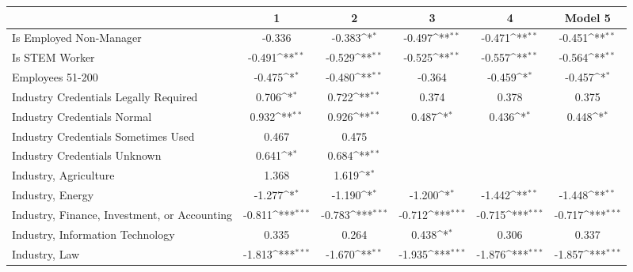 {
\def\sym#1{\ifmmode^{#1}\else\(^{#1}\)\fi}
\begin{tabular}{l*{5}{c}}
\toprule
                         &\multicolumn{1}{c}{1}&\multicolumn{1}{c}{2}&\multicolumn{1}{c}{3}&\multicolumn{1}{c}{4}&\multicolumn{1}{c}{Model 5}\\
\midrule
Is Employed Non-Manager  &      -0.336         &      -0.383\sym{*}  &      -0.497\sym{**} &      -0.471\sym{**} &      -0.451\sym{**} \\
\addlinespace
Is STEM Worker           &      -0.491\sym{**} &      -0.529\sym{**} &      -0.525\sym{**} &      -0.557\sym{**} &      -0.564\sym{**} \\
\addlinespace
Employees 51-200         &      -0.475\sym{*}  &      -0.480\sym{**} &      -0.364         &      -0.459\sym{*}  &      -0.457\sym{*}  \\
\addlinespace
Industry Credentials Legally Required&       0.706\sym{*}  &       0.722\sym{**} &       0.374         &       0.378         &       0.375         \\
\addlinespace
Industry Credentials Normal&       0.932\sym{**} &       0.926\sym{**} &       0.487\sym{*}  &       0.436\sym{*}  &       0.448\sym{*}  \\
\addlinespace
Industry Credentials Sometimes Used&       0.467         &       0.475         &                     &                     &                     \\
\addlinespace
Industry Credentials Unknown&       0.641\sym{*}  &       0.684\sym{**} &                     &                     &                     \\
\addlinespace
Industry, Agriculture    &       1.368         &       1.619\sym{*}  &                     &                     &                     \\
\addlinespace
Industry, Energy         &      -1.277\sym{*}  &      -1.190\sym{*}  &      -1.200\sym{*}  &      -1.442\sym{**} &      -1.448\sym{**} \\
\addlinespace
Industry, Finance, Investment, or Accounting&      -0.811\sym{***}&      -0.783\sym{***}&      -0.712\sym{***}&      -0.715\sym{***}&      -0.717\sym{***}\\
\addlinespace
Industry, Information Technology&       0.335         &       0.264         &       0.438\sym{*}  &       0.306         &       0.337         \\
\addlinespace
Industry, Law            &      -1.813\sym{***}&      -1.670\sym{**} &      -1.935\sym{***}&      -1.876\sym{***}&      -1.857\sym{***}\\

\end{tabular}}
